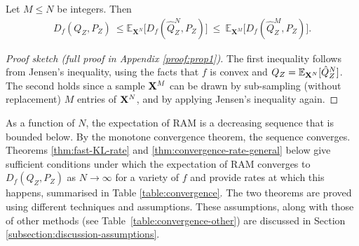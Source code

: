 \begin{proposition}\label{prop:upper-bound}
Let $M \leq N$ be integers. Then
\begin{align}
\label{eq:our-estimate}
    D_f(Q_Z , P_Z) \ \leq 
    \mathbb{E}_{\mathbf{X}^N} \bigl[D_f(\hat{Q}_Z^N , P_Z)\bigr] \  \leq \ \mathbb{E}_{\mathbf{X}^M} \bigl[D_f(\hat{Q}_Z^M , P_Z)\bigr].
\end{align}
\end{proposition}
\begin{proof}[Proof sketch (full proof in Appendix \ref{proof:prop1})]
The first inequality follows from Jensen's inequality, using the facts that $f$ is convex and ${Q_Z = \mathbb{E}_{\mathbf{X}^N} [\hat{Q}_Z^N}]$.
The second holds since a sample ${\mathbf{X}^M}$ can be drawn by sub-sampling (without replacement) $M$ entries of ${\mathbf{X}^N}$, and by applying Jensen's inequality again.
\end{proof}

As a function of $N$, the expectation of RAM is a decreasing sequence that is bounded below.
By the monotone convergence theorem, the sequence converges.
Theorems \ref{thm:fast-KL-rate} and \ref{thm:convergence-rate-general} below give sufficient conditions under which the expectation of RAM converges to $D_f(Q_{Z} , P_Z)$ as $N\to\infty$ for a variety of $f$ and provide rates at which this happens, summarised in Table \ref{table:convergence}.
The two theorems are proved using different techniques and assumptions. 
These assumptions, along with those of other methods (see Table~\ref{table:convergence-other}) are discussed in Section \ref{subsection:discussion-assumptions}.



\medskip


